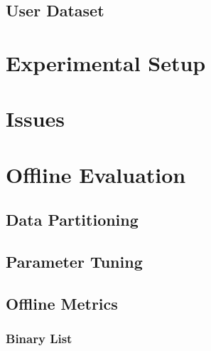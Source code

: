 \subsection{User Dataset}



\section{Experimental Setup}

\section{Issues}

\section{Offline Evaluation}

\subsection{Data Partitioning}

\subsection{Parameter Tuning}

\subsection{Offline Metrics}

\subsubsection{Binary List}

